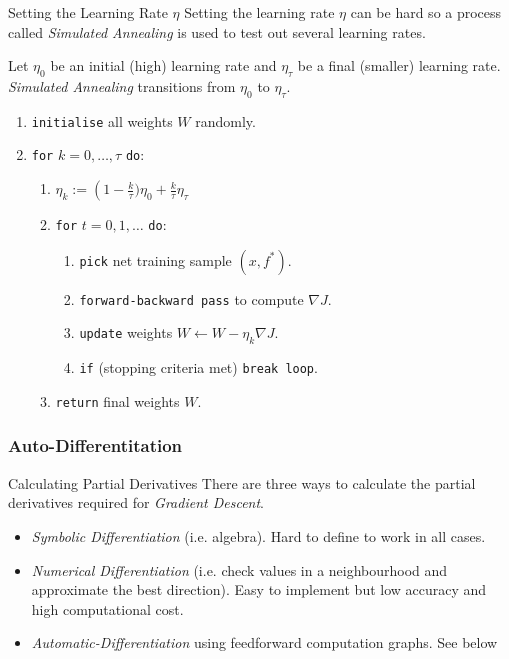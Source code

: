 \documentclass[11pt,a4paper]{article}
\begin{document}
\begin{proposition}{Setting the Learning Rate $\eta$}
  Setting the learning rate $\eta$ can be hard so a process called \textit{Simulated Annealing} is used to test out several learning rates.
  \par Let $\eta_0$ be an initial (high) learning rate and $\eta_\tau$ be a final (smaller) learning rate. \textit{Simulated Annealing} transitions from $\eta_0$ to $\eta_\tau$.
  \begin{enumerate}
    \item \texttt{initialise} all weights $W$ randomly.
    \item \texttt{for} $k=0,\dots,\tau$ \texttt{do}:
    \begin{enumerate}
      \item $\eta_k:=\left(1-\frac{k}\tau)\eta_0+\frac{k}\tau\eta_\tau$
      \item \texttt{for} $t=0,1,\dots$ \texttt{do}:
      \begin{enumerate}
        \item \texttt{pick} net training sample $(x,f^*)$.
        \item \texttt{forward-backward pass} to compute $\nabla J$.
        \item \texttt{update} weights $W\leftarrow W-\eta_k\nabla J$.
        \item \texttt{if} (stopping criteria met) \texttt{break loop}.
      \end{enumerate}
      \item \texttt{return} final weights $W$.
    \end{enumerate}
  \end{enumerate}
\end{proposition}

\subsubsection{Auto-Differentitation}

\begin{proposition}{Calculating Partial Derivatives}
  There are three ways to calculate the partial derivatives required for \textit{Gradient Descent}.
  \begin{itemize}
    \item \textit{Symbolic Differentiation} (i.e. algebra). Hard to define to work in all cases.
    \item \textit{Numerical Differentiation} (i.e. check values in a neighbourhood and approximate the best direction). Easy to implement but low accuracy and high computational cost.
    \item \textit{Automatic-Differentiation} using feedforward computation graphs. See below
  \end{itemize}
\end{proposition}
\end{document}

